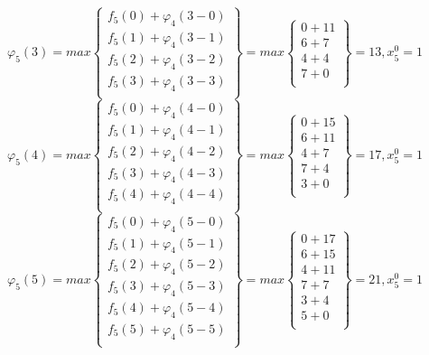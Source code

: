 $\varphi_5(3) = max \begin{Bmatrix}
    f_5(0) + \varphi_4(3 - 0) \\
    f_5(1) + \varphi_4(3 - 1) \\
    f_5(2) + \varphi_4(3 - 2) \\
    f_5(3) + \varphi_4(3 - 3) \\
\end{Bmatrix} = max \begin{Bmatrix}
    0 + 11 \\
    6 + 7 \\
    4 + 4 \\
    7 + 0 \\
\end{Bmatrix} = 13, x_5^0 = 1$\\

$\varphi_5(4) = max \begin{Bmatrix}
    f_5(0) + \varphi_4(4 - 0) \\
    f_5(1) + \varphi_4(4 - 1) \\
    f_5(2) + \varphi_4(4 - 2) \\
    f_5(3) + \varphi_4(4 - 3) \\
    f_5(4) + \varphi_4(4 - 4) \\
\end{Bmatrix} = max \begin{Bmatrix}
    0 + 15 \\
    6 + 11 \\
    4 + 7 \\
    7 + 4 \\
    3 + 0 \\
\end{Bmatrix} = 17, x_5^0 = 1$\\

$\varphi_5(5) = max \begin{Bmatrix}
    f_5(0) + \varphi_4(5 - 0) \\
    f_5(1) + \varphi_4(5 - 1) \\
    f_5(2) + \varphi_4(5 - 2) \\
    f_5(3) + \varphi_4(5 - 3) \\
    f_5(4) + \varphi_4(5 - 4) \\
    f_5(5) + \varphi_4(5 - 5) \\
\end{Bmatrix} = max \begin{Bmatrix}
    0 + 17 \\
    6 + 15 \\
    4 + 11 \\
    7 + 7 \\
    3 + 4 \\
    5 + 0 \\
\end{Bmatrix} = 21, x_5^0 = 1$\\

